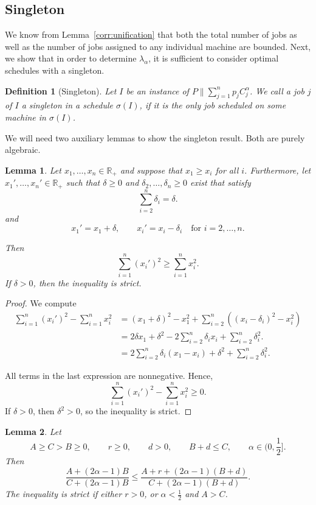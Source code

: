 \documentclass[%
english, titlepage=false %
]{./tum-templates/book/tumbook}
\newtheorem{lemma}{Lemma}
\newtheorem{definition}{Definition}
\begin{document}
\subsection*{Singleton}

We know from Lemma~\ref{corr:unification} that both the total number of jobs as well as the number of jobs assigned
to any individual machine are bounded. Next, we show that in order to determine $\lambda_{\alpha}$, it is sufficient to
consider optimal schedules with a singleton.

\begin{definition}[Singleton]
Let \(I\) be an instance of \(P\!\parallel\!\sum_{j=1}^{n}p_j C_j^{\alpha}\).
We call a job $j$ of $I$ a singleton in a schedule $\sigma(I)$, if it is the only job scheduled on 
some machine in $\sigma(I)$.
\end{definition}
We will need two auxiliary lemmas to show the singleton result.
Both are purely algebraic.

\begin{lemma}\label{lem:peak-increase}
Let $x_1,\dots,x_n \in \mathbb{R}_{+}$ 
and suppose that $x_1 \ge x_i$ for all $i$.
Furthermore, let $x_1', \dots, x_n' \in \mathbb{R}_{+}$ such that
$\delta\geq0$ and 
$\delta_2,\dots,\delta_n \ge 0$ exist that satisfy
\[
\sum_{i=2}^n \delta_i = \delta.
\]
and
\[
x_1' = x_1+\delta,
\qquad
x_i' = x_i-\delta_i \quad \text{for } i=2,\dots,n.
\]

Then
\[
\sum_{i=1}^n (x_i')^2 \geq \sum_{i=1}^n x_i^2.
\]
If \(\delta>0\), then the inequality is strict.
\end{lemma}

\begin{proof}
We compute
\begin{align*}
\sum_{i=1}^n (x_i')^2-\sum_{i=1}^n x_i^2
&=
(x_1+\delta)^2-x_1^2
+
\sum_{i=2}^n \left((x_i-\delta_i)^2-x_i^2\right)\\
&=
2\delta x_1+\delta^2
-
2\sum_{i=2}^n \delta_i x_i
+
\sum_{i=2}^n \delta_i^2.\\
&=
2\sum_{i=2}^n \delta_i(x_1-x_i)
+
\delta^2
+
\sum_{i=2}^n \delta_i^2.
\end{align*}

All terms in the last expression are nonnegative. Hence,
\[
\sum_{i=1}^n (x_i')^2-\sum_{i=1}^n x_i^2 \geq 0.
\]
If \(\delta>0\), then \(\delta^2>0\), so the inequality is strict.

\end{proof}

\begin{lemma}\label{lem:ratio-monotonicity}
Let
\[
A\geq C>B\ge 0,\qquad r\geq0,\qquad d>0,\qquad B+d\leq C,
\qquad \alpha \in \Big(0, \frac12\Big].
\]
Then
\[
\frac{A+(2\alpha-1)B}{C+(2\alpha-1)B}
\le
\frac{A+r+(2\alpha-1)(B+d)}{C+(2\alpha-1)(B+d)}.
\]
The inequality is strict if either $r>0$, or
\(\alpha<\frac12\) and $A>C$.
\end{lemma}
\end{document}
